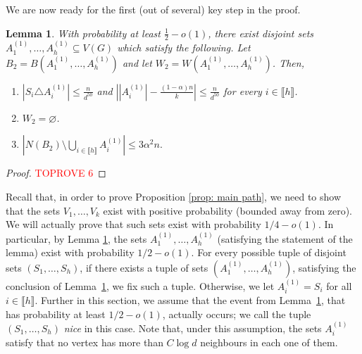 \documentclass[notitlepage]{scrartcl}
\newcommand{\br}[1]{\llbracket{#1}\rrbracket}
\newtheorem{lemma}[thm]{Lemma}
\begin{document}
We are now ready for the first (out of several) key step in the proof.
\begin{lemma}\label{l: first LLL large degree}
With probability at least $\frac{1}{2}-o(1)$, there exist disjoint sets $A_1^{(1)},\ldots, A_h^{(1)}\subseteq V(G)$ which satisfy the following. Let $B_2=B\left(A_1^{(1)},\ldots, A_h^{(1)}\right)$ and let $W_2=W\left(A_1^{(1)},\ldots, A_h^{(1)}\right)$. Then,
\begin{enumerate}
    \item $\left|S_i\triangle A_i^{(1)}\right|\le \frac{n}{d^{50}}$ and $\left||A_i^{(1)}|-\frac{(1-\alpha)n}{k}\right|\le \frac{n}{d^{50}}$ for every $i\in \br{h}$.
    \item $W_2=\varnothing$.
    \item $\left|N(B_2)\setminus\bigcup_{i\in \br{h}} A_i^{(1)}\right|\le 3\alpha^2n.$
\end{enumerate}
\end{lemma}
\begin{proof}\textcolor{red}{TOPROVE 6}\end{proof}

Recall that, in order to prove Proposition \ref{prop: main path}, we need to show that the sets $V_1,\ldots, V_k$ exist with positive probability (bounded away from zero). We will actually prove that such sets exist with probability $1/4-o(1)$. In particular, by Lemma \ref{l: first LLL large degree}, the sets $A_1^{(1)},\ldots, A_h^{(1)}$ (satisfying the statement of the lemma) exist with probability $1/2-o(1)$. For every possible tuple of disjoint sets $(S_1,\ldots,S_h)$, if there exists a tuple of sets $(A_1^{(1)},\ldots,A_h^{(1)})$, satisfying the conclusion of Lemma~\ref{l: first LLL large degree}, we fix such a tuple. Otherwise, we let $A_i^{(1)}=S_i$ for all $i\in \br{h}$. Further in this section, we assume that the event from Lemma~\ref{l: first LLL large degree}, that has probability at least $1/2-o(1)$, actually occurs; we call the tuple $(S_1,\ldots,S_h)$ \emph{nice} in this case.
Note that, under this assumption, the sets $A_i^{(1)}$ satisfy that no vertex has more than $C\log d$ neighbours in each one of them.
\end{document}
